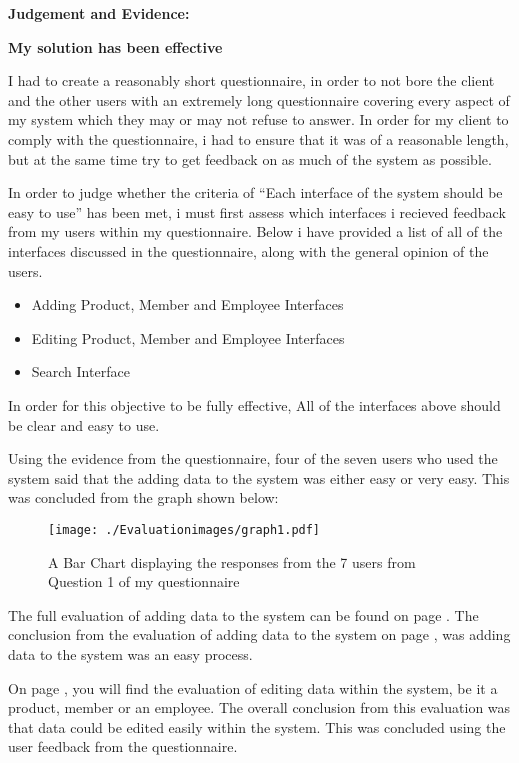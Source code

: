 \textbf{Judgement and Evidence:} \newline

\textbf{\large{My solution has been effective}}

I had to create a reasonably short questionnaire, in order to not bore the client and the other users with an extremely long questionnaire covering every aspect of my system which they may or may not refuse to answer. In order for my client to comply with the questionnaire, i had to ensure that it was of a reasonable length, but at the same time try to get feedback on as much of the system as possible.

In order to judge whether the criteria of ``Each interface of the system should be easy to use'' has been met, i must first assess which interfaces i recieved feedback from my users within my questionnaire. Below i have provided a list of all of the interfaces discussed in the questionnaire, along with the general opinion of the users.

\begin{itemize}
	\item{Adding Product, Member and Employee Interfaces} 
	\item{Editing Product, Member and Employee Interfaces}
	\item{Search Interface}
\end{itemize}

In order for this objective to be fully effective, All of the interfaces above should be clear and easy to use.

Using the evidence from the questionnaire, four of the seven users who used the system said that the adding data to the system was either easy or very easy. This was concluded from the graph shown below:

\begin{figure}[H]
\caption{A Bar Chart displaying the responses from the 7 users from Question 1 of my questionnaire} \label{graph1}
\hfill\texttt{[image: ./Evaluationimages/graph1.pdf]}
\end{figure}

The full evaluation of adding data to the system can be found on page \pageref{general}. The conclusion from the evaluation of adding data to the system on page \pageref{general}, was adding data to the system was an easy process.

On page \pageref{edit}, you will find the evaluation of editing data within the system, be it a product, member or an employee. The overall conclusion from this evaluation was that data could be edited easily within the system. This was concluded using the user feedback from the questionnaire.

